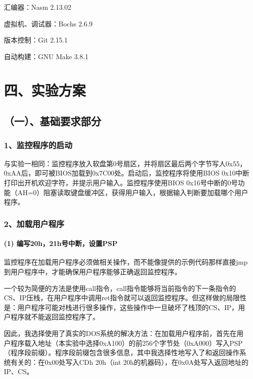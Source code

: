 \documentclass[ctexart]{article}
\let\oldparagraph\paragraph
\renewcommand{\paragraph}[1]{\oldparagraph{#1}\mbox{}}
\begin{document}
汇编器：Nasm 2.13.02

虚拟机、调试器：Bochs 2.6.9

版本控制：Git 2.15.1

自动构建：GNU Make 3.8.1

\hypertarget{header-n21}{%
\section{四、实验方案}\label{header-n21}}

\hypertarget{header-n22}{%
\subsection{（一）、基础要求部分}\label{header-n22}}

\hypertarget{header-n310}{%
\subsubsection{1、监控程序的启动}\label{header-n310}}

与实验一相同：监控程序放入软盘第0号扇区，并将扇区最后两个字节写人0x55，0xAA后，即可被BIOS加载到0x7C00处。启动后，监控程序将使用BIOS
0x10中断打印出开机欢迎字符，并提示用户输入。监控程序使用BIOS
0x16号中断的0号功能（AH=0）阻塞读取键盘缓冲区，获得用户输入，根据输入判断要加载哪个用户程序。

\hypertarget{header-n324}{%
\subsubsection{2、加载用户程序}\label{header-n324}}

\hypertarget{header-n326}{%
\paragraph{(1) 编写20h，21h号中断，设置PSP}\label{header-n326}}

监控程序在加载用户程序必须做相关操作，而不能像提供的示例代码那样直接jmp到用户程序中，才能确保用户程序能够正确返回监控程序。

一个较为简便的方法是使用call指令，call指令能够将当前指令的下一条指令的CS、IP压栈，在用户程序中调用ret指令就可以返回监控程序。但这样做的局限性是：用户程序可能对栈进行很多操作，这些操作中一旦破坏了栈顶的CS、IP，用户程序就不能返回监控程序了。

因此，我选择使用了真实的DOS系统的解决方法：在加载用户程序前，首先在用户程序载入地址（本实验中选择0xA100）的前256个字节处（0xA000）写入PSP（程序段前缀）。程序段前缀包含很多信息，其中我选择性地写入了和返回操作系统有关的：在0x00处写入CDh
20h（int 20h的机器码），在0x0A处写入返回地址的IP、CS。
\end{document}
